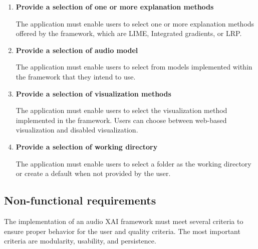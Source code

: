 \documentclass[
    bindingoffset=5mm,  %
    footnoteindent=3mm, %
    hyphenation=true    %
]{src/wut-thesis}
\begin{document}
    \begin{enumerate}[itemsep=1\baselineskip]

    \item \textbf{Provide a selection of one or more explanation methods}

        The application must enable users to select one or more explanation methods offered by
    the framework, which are LIME, Integrated gradients, or LRP.

    \item \textbf{Provide a selection of audio model}

        The application must enable users to select from models implemented within the framework that they
    intend to use. 

    \item \textbf{Provide a selection of visualization methods}

        The application must enable users to select the visualization method implemented in the framework.
    Users can choose between web-based visualization and disabled visualization.

    \item \textbf{Provide a selection of working directory}

    The application must enable users to select a folder as the working directory or create a default when not provided by the user.

    \end{enumerate}

\subsection{Non-functional requirements} \label{ch:NonFuncRequirements}

    The implementation of an audio XAI framework must meet several criteria
    to ensure proper behavior for the user and quality criteria.
    The most important criteria are modularity, usability, and persistence.
\end{document}

